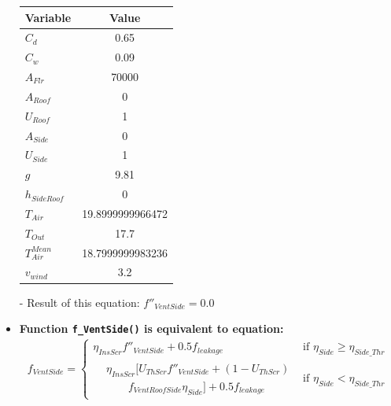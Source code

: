 \documentclass[a4paper]{article}
\numberwithin{equation}{section}
\begin{document}
\begin{itemize}
        \begin{table}[H]
          \centering
          \begin{tabular}{@{}lS[table-format=5.13]@{}}
            \toprule
            \textbf{Variable}  & \textbf{Value}   \\
            \midrule
            \( C_d \)            & 0.65             \\
            \( C_w \)            & 0.09             \\
            \( A_{Flr} \)        & 70000            \\
            \( A_{Roof} \)       & 0                \\
            \( U_{Roof} \)       & 1                \\
            \( A_{Side} \)       & 0                \\
            \( U_{Side} \)       & 1                \\
            \( g \)              & 9.81             \\
            \( h_{SideRoof} \)   & 0                \\
            \( T_{Air} \)        & 19.8999999966472 \\
            \( T_{Out} \)        & 17.7             \\
            \( T_{Air}^{Mean} \) & 18.7999999983236 \\
            \( v_{wind} \)       & 3.2              \\
            \bottomrule
          \end{tabular}
        \end{table}

  \item[-] Result of this equation: \( f''_{VentSide} = 0.0 \)

  \item \textbf{Function \texttt{f\_VentSide()} is equivalent to equation:}\label{fVentSide}
        \begin{gather*}
          f_{VentSide} =
          \begin{cases}
            \eta_{InsScr} f''_{VentSide} + 0.5f_{leakage} & \text{if~} \eta_{Side} \geq \eta_{Side\_Thr} \\
            \begin{split}
              & \eta_{InsScr} [U_{ThScr}f''_{VentSide} + (1-U_{ThScr}) \\
              & \qquad f_{VentRoofSide} \eta_{Side}] + 0.5 f_{leakage}
            \end{split}                   & \text{if~} \eta_{Side} < \eta_{Side\_Thr}
          \end{cases}
        \end{gather*}


\end{itemize}
\end{document}
